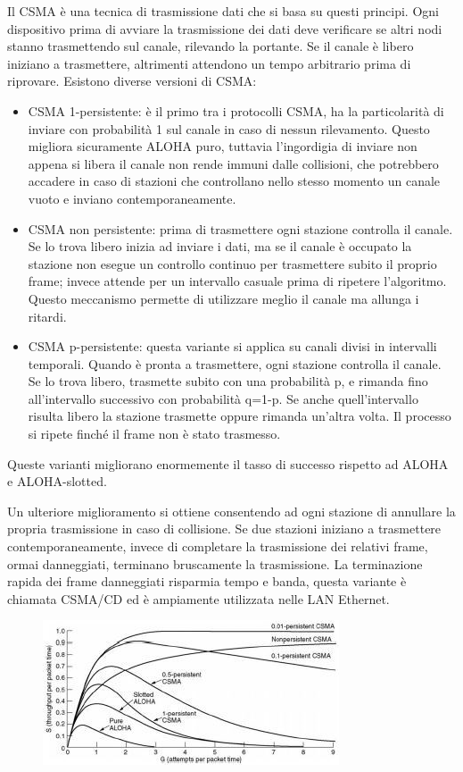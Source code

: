 Il CSMA è una tecnica di trasmissione dati che si basa su questi principi. Ogni dispositivo prima di avviare la trasmissione dei dati deve verificare se altri nodi stanno trasmettendo sul canale, rilevando la portante. Se il canale è libero iniziano a trasmettere, altrimenti attendono un tempo arbitrario prima di riprovare.
Esistono diverse versioni di CSMA:
\begin{itemize}
\item	CSMA 1-persistente: è il primo tra i protocolli CSMA, ha la particolarità di inviare con probabilità 1 sul canale in caso di nessun rilevamento. Questo migliora sicuramente ALOHA puro, tuttavia l’ingordigia di inviare non appena si libera il canale non rende immuni dalle collisioni, che potrebbero accadere in caso di stazioni che controllano nello stesso momento un canale vuoto e inviano contemporaneamente.
\item	CSMA non persistente: prima di trasmettere ogni stazione controlla il canale. Se lo trova libero inizia ad inviare i dati, ma se il canale è occupato la stazione non esegue un controllo continuo per trasmettere subito il proprio frame; invece attende per un intervallo casuale prima di ripetere l’algoritmo. Questo meccanismo permette di utilizzare meglio il canale ma allunga i ritardi.
\item	CSMA p-persistente: questa variante si applica su canali divisi in intervalli temporali. Quando è pronta a trasmettere, ogni stazione controlla il canale. Se lo trova libero, trasmette subito con una probabilità p, e rimanda fino all’intervallo successivo con probabilità q=1-p. Se anche quell’intervallo risulta libero la stazione trasmette oppure rimanda un’altra volta. Il processo si ripete finché il frame non è stato trasmesso.
\end{itemize}
Queste varianti migliorano enormemente il tasso di successo rispetto ad ALOHA e ALOHA-slotted.

Un ulteriore miglioramento si ottiene consentendo ad ogni stazione di annullare la propria trasmissione in caso di collisione. Se due stazioni iniziano a trasmettere contemporaneamente, invece di completare la trasmissione dei relativi frame, ormai danneggiati, terminano bruscamente la trasmissione. La terminazione rapida dei frame danneggiati risparmia tempo e banda, questa variante è chiamata CSMA/CD ed è ampiamente utilizzata nelle LAN Ethernet.

\begin{figure}[H]
\centering
\includegraphics[scale=1]{res/img/23_CSMA.png}
\end{figure}

